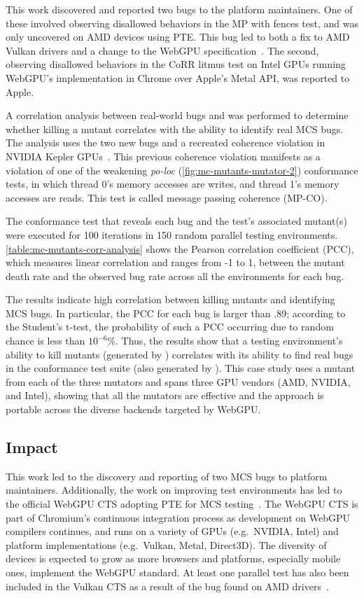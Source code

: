 This work discovered and reported two bugs to the platform maintainers. One of these involved observing disallowed behaviors in the MP with fences test, and was only uncovered on AMD devices using PTE. This bug led to both a fix to AMD Vulkan drivers and a change to the WebGPU specification~\cite{webgpu-spec-change}. The second, observing disallowed behaviors in the CoRR litmus test on Intel GPUs running WebGPU's implementation in Chrome over Apple's Metal API, was reported to Apple.

A correlation analysis between real-world bugs and \sys was performed to determine whether killing a mutant correlates with the ability to identify real MCS bugs. The analysis uses the two new bugs and a recreated coherence violation in NVIDIA Kepler GPUs~\cite{alglave2015gpu}. This previous coherence violation manifests as a violation of one of the weakening \textit{po-loc} (\myfig\ref{fig:mc-mutants-mutator-2}) conformance tests, in which thread 0's memory accesses are writes, and thread 1's memory accesses are reads. This test is called message passing coherence (MP-CO).

The conformance test that reveals each bug and the test's associated mutant(s) were executed for 100 iterations in 150 random parallel testing environments. \mytab\ref{table:mc-mutants-corr-analysis} shows the Pearson correlation coefficient (PCC), which measures linear correlation and ranges from -1 to 1, between the mutant death rate and the observed bug rate across all the environments for each bug.

The results indicate high correlation between killing mutants and identifying MCS bugs.  In particular, the PCC for each bug is larger than .89; according to the Student's t-test, the probability of such a PCC occurring due to random chance is less than $10^{-6}$\%. Thus, the results show that a testing environment's ability to kill mutants (generated by \sys) correlates with its ability to find real bugs in the conformance test suite (also generated by \sys). This case study uses a mutant from each of the three mutators and spans three GPU vendors (AMD, NVIDIA, and Intel), showing that all the mutators are effective and the approach is portable across the diverse backends targeted by WebGPU.

\subsection{Impact\label{sec:mc-mutants-impact}}

This work led to the discovery and reporting of two MCS bugs to platform maintainers. Additionally, the work on improving test environments has led to the official WebGPU CTS adopting PTE for MCS testing~\cite{webgpu-cts}. The WebGPU CTS is part of Chromium's continuous integration process as development on WebGPU compilers continues, and runs on a variety of GPUs (e.g.\ NVIDIA, Intel) and platform implementations (e.g.\ Vulkan, Metal, Direct3D). The diversity of devices is expected to grow as more browsers and platforms, especially mobile ones, implement the WebGPU standard. At least one parallel test has also been included in the Vulkan CTS as a result of the bug found on AMD drivers~\cite{vulkan-parallel-tests}.

